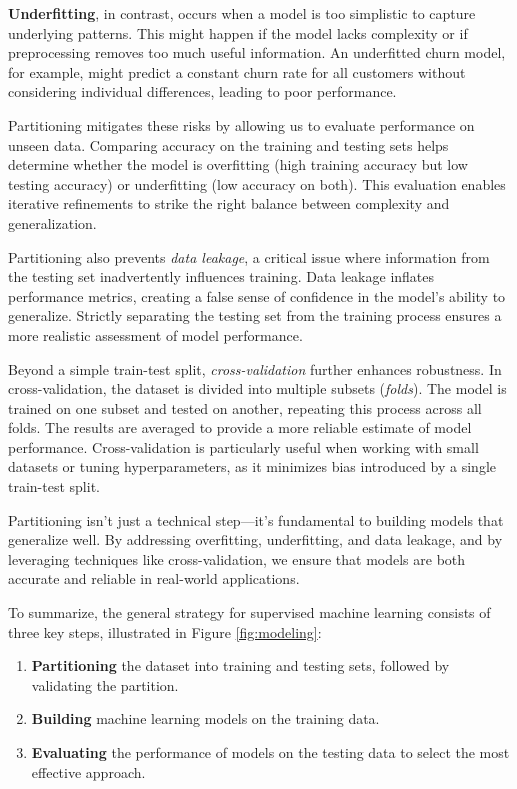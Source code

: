 \documentclass[
]{book}
\providecommand{\tightlist}{%
  \setlength{\itemsep}{0pt}\setlength{\parskip}{0pt}}
\theoremstyle{definition}
\theoremstyle{definition}
\theoremstyle{definition}
\theoremstyle{definition}
\theoremstyle{remark}
\begin{document}
\textbf{Underfitting}, in contrast, occurs when a model is too simplistic to capture underlying patterns. This might happen if the model lacks complexity or if preprocessing removes too much useful information. An underfitted churn model, for example, might predict a constant churn rate for all customers without considering individual differences, leading to poor performance.

Partitioning mitigates these risks by allowing us to evaluate performance on unseen data. Comparing accuracy on the training and testing sets helps determine whether the model is overfitting (high training accuracy but low testing accuracy) or underfitting (low accuracy on both). This evaluation enables iterative refinements to strike the right balance between complexity and generalization.

Partitioning also prevents \emph{data leakage}, a critical issue where information from the testing set inadvertently influences training. Data leakage inflates performance metrics, creating a false sense of confidence in the model's ability to generalize. Strictly separating the testing set from the training process ensures a more realistic assessment of model performance.

Beyond a simple train-test split, \emph{cross-validation} further enhances robustness. In cross-validation, the dataset is divided into multiple subsets (\emph{folds}). The model is trained on one subset and tested on another, repeating this process across all folds. The results are averaged to provide a more reliable estimate of model performance. Cross-validation is particularly useful when working with small datasets or tuning hyperparameters, as it minimizes bias introduced by a single train-test split.

Partitioning isn't just a technical step---it's fundamental to building models that generalize well. By addressing overfitting, underfitting, and data leakage, and by leveraging techniques like cross-validation, we ensure that models are both accurate and reliable in real-world applications.

To summarize, the general strategy for supervised machine learning consists of three key steps, illustrated in Figure \ref{fig:modeling}:

\begin{enumerate}
\def\labelenumi{\arabic{enumi}.}
\tightlist
\item
  \textbf{Partitioning} the dataset into training and testing sets, followed by validating the partition.
\item
  \textbf{Building} machine learning models on the training data.
\item
  \textbf{Evaluating} the performance of models on the testing data to select the most effective approach.
\end{enumerate}
\end{document}
